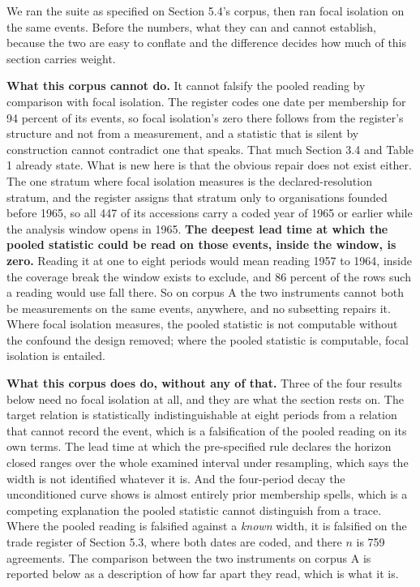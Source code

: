 \documentclass[twoside,11pt]{article}
\begin{document}
We ran the suite as specified on Section 5.4's corpus, then ran focal isolation on the same events. Before the numbers, what they can and cannot establish, because the two are easy to conflate and the difference decides how much of this section carries weight.

\textbf{What this corpus cannot do.} It cannot falsify the pooled reading by comparison with focal isolation. The register codes one date per membership for 94 percent of its events, so focal isolation's zero there follows from the register's structure and not from a measurement, and a statistic that is silent by construction cannot contradict one that speaks. That much Section 3.4 and Table 1 already state. What is new here is that the obvious repair does not exist either. The one stratum where focal isolation measures is the declared-resolution stratum, and the register assigns that stratum only to organisations founded before 1965, so all 447 of its accessions carry a coded year of 1965 or earlier while the analysis window opens in 1965. \textbf{The deepest lead time at which the pooled statistic could be read on those events, inside the window, is zero.} Reading it at one to eight periods would mean reading 1957 to 1964, inside the coverage break the window exists to exclude, and 86 percent of the rows such a reading would use fall there. So on corpus A the two instruments cannot both be measurements on the same events, anywhere, and no subsetting repairs it. Where focal isolation measures, the pooled statistic is not computable without the confound the design removed; where the pooled statistic is computable, focal isolation is entailed.

\textbf{What this corpus does do, without any of that.} Three of the four results below need no focal isolation at all, and they are what the section rests on. The target relation is statistically indistinguishable at eight periods from a relation that cannot record the event, which is a falsification of the pooled reading on its own terms. The lead time at which the pre-specified rule declares the horizon closed ranges over the whole examined interval under resampling, which says the width is not identified whatever it is. And the four-period decay the unconditioned curve shows is almost entirely prior membership spells, which is a competing explanation the pooled statistic cannot distinguish from a trace. Where the pooled reading is falsified against a \emph{known} width, it is falsified on the trade register of Section 5.3, where both dates are coded, and there \(n\) is 759 agreements. The comparison between the two instruments on corpus A is reported below as a description of how far apart they read, which is what it is.
\end{document}
